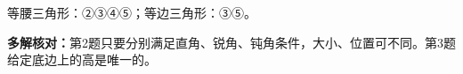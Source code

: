 
\begingroup\color{answerred}等腰三角形：②③④⑤；等边三角形：③⑤。\par\endgroup
{}
\begingroup\color{answerred}\par\noindent\begin{center}\end{center}\par\endgroup
{}
\begingroup\color{answerred}\par\noindent\begin{center}\end{center}\par\endgroup

\begingroup\color{answerred}\textbf{多解核对：}第2题只要分别满足直角、锐角、钝角条件，大小、位置可不同。第3题给定底边上的高是唯一的。\par\endgroup
